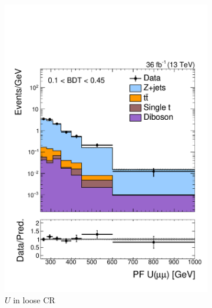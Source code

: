 \begin{figure}[]
    \begin{center}
        \begin{subfigure}[t]{0.49\textwidth}
            \includegraphics[width=\textwidth]{figures/monotop/prefit/dimuon_loose_pfUZmag_logy.pdf}
            \caption{$U$ in loose CR}
        \end{subfigure}
        \begin{subfigure}[t]{0.49\textwidth}

\end{subfigure}
\end{center}
\end{figure}
